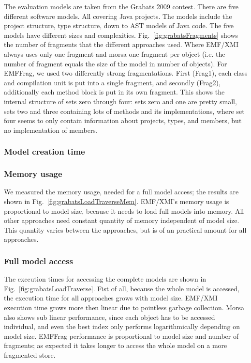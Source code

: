 The evaluation models are taken from the Grabats 2009 contest. There are five different software models. All covering Java projects. The models include the project structure, type structure, down to AST models of Java code. The five models have different sizes and complexities. Fig.~\ref{fig:grabatsFragments} shows the number of fragments that the different approaches used. Where EMF/XMI always uses only one fragment and morsa one fragment per object (i.e. the number of fragment equals the size of the model in number of objects). For EMFFrag, we used two differently strong fragmentations. First (Frag1), each class and compilation unit is put into a single fragment, and secondly (Frag2), additionally each method block is put in its own fragment. This shows the internal structure of sets zero through four: sets zero and one are pretty small, sets two and three containing lots of methods and its implementations, where set four seems to only contain information about projects, types, and members, but no implementation of members.

\subsubsection*{Model creation time}

\subsubsection*{Memory usage}

We measured the memory usage, needed for a full model access; the results are shown in Fig.~\ref{fig:grabatsLoadTraverseMem}. EMF/XMI's memory usage is proportional to model size, because it needs to load full models into memory. All other approaches need constant quantity of memory independent of model size. This quantity varies between the approaches, but is of an practical amount for all approaches. 

\subsubsection*{Full model access}

The execution times for accessing the complete models are shown in Fig.~\ref{fig:grabatsLoadTraverse}. Fist of all,  because the whole model is accessed, the execution time for all approaches grows with model size. EMF/XMI execution time grows more then linear due to pointless garbage collection. Morsa also shows sub linear performance, since each object has to be accessed individual, and even the best index only performs logarithmically depending on model size. EMFFrag performance is proportional to model size and number of fragments; as expected it takes longer to access the whole model on a more fragmented store.

